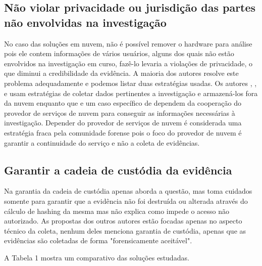 \documentclass[conference]{IEEEtran}
\begin{document}
\subsection{Não violar privacidade ou jurisdição das partes não envolvidas na investigação}

No caso das soluções em nuvem, não é possível remover o hardware para análise pois ele contem informações de vários usuários, alguns dos quais não estão envolvidos na investigação em curso, fazê-lo levaria a violações de privacidade, o que diminui a credibilidade da evidência. 
%
A maioria dos autores resolve este problema adequadamente e podemos listar duas estratégias usadas. 
%
Os autores \cite{Reichert2015}, \cite{George2012}, \cite{Poisel2013} e \cite{Dykstra2013} usam estratégias de coletar dados pertinentes a investigação e armazená-los fora da nuvem enquanto que \cite{Sang2013} e um caso específico de \cite{George2012} dependem da cooperação do provedor de serviços de nuvem para conseguir as informações necessárias à investigação. 
%
Depender do provedor de serviços de nuvem é considerada uma estratégia fraca pela comunidade forense pois o foco do provedor de nuvem é garantir a continuidade do serviço e não a coleta de evidências.

\subsection{Garantir a cadeia de custódia da evidência}

Na garantia da cadeia de custódia apenas \cite{Sang2013} aborda a questão, mas toma cuidados somente para garantir que a evidência não foi destruída ou alterada através do cálculo de hashing da mesma mas não explica como impede o acesso não autorizado. 
%
As propostas dos outros autores estão focadas apenas no aspecto técnico da coleta, nenhum deles menciona garantia de custódia, apenas que as evidências são coletadas de forma "forensicamente aceitável".

A Tabela 1 mostra um comparativo das soluções estudadas.
\end{document}
